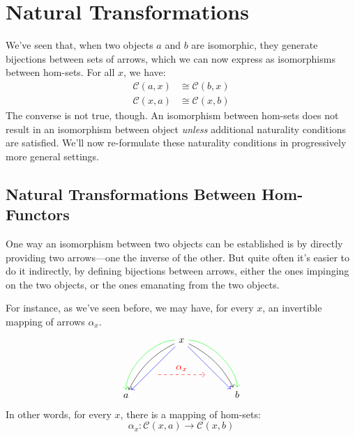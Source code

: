 \documentclass[DaoFP]{subfiles}
\begin{document}
\setcounter{chapter}{8}

\chapter{Natural Transformations}

We've seen that, when two objects $a$ and $b$ are isomorphic, they generate bijections between sets of arrows, which we can now express as isomorphisms between hom-sets. For all $x$, we have:
\begin{align*}
\mathcal{C}(a, x) &\cong \mathcal{C}(b, x) \\
\mathcal{C}(x, a) &\cong \mathcal{C}(x, b)
\end{align*}
The converse is not true, though. An isomorphism between hom-sets does not result in an isomorphism between object \emph{unless} additional naturality conditions are satisfied. We'll now re-formulate these naturality conditions in progressively more general settings.

\section{Natural Transformations Between Hom-Functors}

One way an isomorphism between two objects can be established is by directly providing two arrows---one the inverse of the other. But quite often it's easier to do it indirectly, by defining bijections between arrows, either the ones impinging on the two objects, or the ones emanating from the two objects. 

For instance, as we've seen before, we may have, for every $x$, an invertible mapping of arrows $\alpha_x$.
\[
 \begin{tikzcd}
 \node(x) at (0, 2) {x};
 \node(a) at (-2, 0) {a};
 \node(b) at (2, 0) {b};
 \node(c1) at (-1, 1.5) {};
 \node(c2) at (-1.5, 1) {};
 \node(c3) at (-1, 2) {};
 \node(c4) at (-2, 1) {};
 \node(d1) at (1, 1.5) {};
 \node(d2) at (1.5, 1) {};
 \node(d3) at (1, 2) {};
 \node(d4) at (2, 1) {};
\node (aa) at (-1, 0.75) {};
 \node (bb) at (1, 0.75) {};
 \draw[->] (x) .. controls (c1)  and (c2) .. (a); %
 \draw[->, green] (x) .. controls (c3)  and (c4) .. (a); %
 \draw[->, blue] (x) -- (a); 
  \draw[->] (x) .. controls (d1)  and (d2) .. (b); %
 \draw[->, green] (x) .. controls (d3)  and (d4) .. (b); %
 \draw[->, blue] (x) -- (b); 
 \draw[->, red, dashed] (aa) -- node[above]{\alpha_x} (bb);
 \end{tikzcd}
\]
In other words, for every $x$, there is a mapping of hom-sets:
\[ \alpha_x \colon \mathcal{C}(x, a) \to \mathcal{C}(x, b) \]
\end{document}
